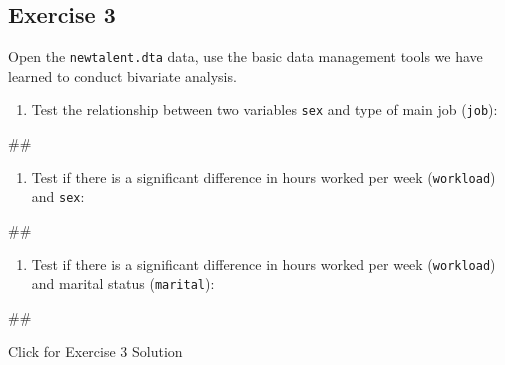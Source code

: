 \documentclass[
]{book}
\newenvironment{Shaded}{\begin{snugshade}}{\end{snugshade}}
\newcommand{\NormalTok}[1]{#1}
\providecommand{\tightlist}{%
  \setlength{\itemsep}{0pt}\setlength{\parskip}{0pt}}
\begin{document}
\hypertarget{exercise-3-4}{%
\subsection{Exercise 3}\label{exercise-3-4}}

Open the \texttt{newtalent.dta} data, use the basic data management tools we have learned to conduct bivariate analysis.

\begin{enumerate}
\def\labelenumi{\arabic{enumi}.}
\tightlist
\item
  Test the relationship between two variables \texttt{sex} and type of main job (\texttt{job}):
\end{enumerate}

\begin{Shaded}
\begin{Highlighting}[]
\NormalTok{\#\#}
\end{Highlighting}
\end{Shaded}

\begin{enumerate}
\def\labelenumi{\arabic{enumi}.}
\setcounter{enumi}{1}
\tightlist
\item
  Test if there is a significant difference in hours worked per week (\texttt{workload}) and \texttt{sex}:
\end{enumerate}

\begin{Shaded}
\begin{Highlighting}[]
\NormalTok{\#\#}
\end{Highlighting}
\end{Shaded}

\begin{enumerate}
\def\labelenumi{\arabic{enumi}.}
\setcounter{enumi}{2}
\tightlist
\item
  Test if there is a significant difference in hours worked per week (\texttt{workload}) and marital status (\texttt{marital}):
\end{enumerate}

\begin{Shaded}
\begin{Highlighting}[]
\NormalTok{\#\#}
\end{Highlighting}
\end{Shaded}

{Click for Exercise 3 Solution}
\end{document}
